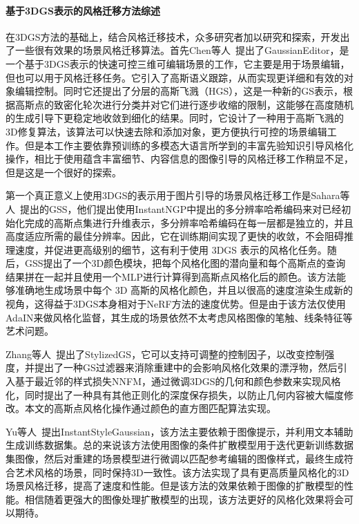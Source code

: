 \paragraph{基于3DGS表示的风格迁移方法综述}
在3DGS方法的基础上，结合风格迁移技术，众多研究者加以研究和探索，开发出了一些很有效果的场景风格迁移算法。首先Chen等人~\cite{chen2024gaussianeditor}提出了GaussianEditor，是一个基于3DGS表示的快速可控三维可编辑场景的工作，它主要是用于场景编辑，但也可以用于风格迁移任务。它引入了高斯语义跟踪，从而实现更详细和有效的对象编辑控制。同时它还提出了分层的高斯飞溅（HGS），这是一种新的GS表示，根据高斯点的致密化轮次进行分类并对它们进行逐步收缩的限制，这能够在高度随机的生成引导下更稳定地收敛到细化的结果。同时，它设计了一种用于高斯飞溅的3D修复算法，该算法可以快速去除和添加对象，更方便执行可控的场景编辑工作。但是本工作主要依靠预训练的多模态大语言所学到的丰富先验知识引导风格化操作，相比于使用蕴含丰富细节、内容信息的图像引导的风格迁移工作稍显不足，但是这是一个很好的探索。

\par 第一个真正意义上使用3DGS的表示用于图片引导的场景风格迁移工作是Sahara等人~\cite{saroha2024gaussian}提出的GSS，他们提出使用InstantNGP中提出的多分辨率哈希编码来对已经初始化完成的高斯点集进行升维表示，多分辨率哈希编码在每一层都是独立的，并且高度适应所需的最佳分辨率。因此，它在训练期间实现了更快的收敛，不会阻碍推理速度，并促进更高级别的细节，这有利于使用 3DGS 表示的风格化任务。随后，GSS提出了一个3D颜色模块，把每个风格化图的潜向量和每个高斯点的查询结果拼在一起并且使用一个MLP进行计算得到高斯点风格化后的颜色。该方法能够准确地生成场景中每个 3D 高斯的风格化颜色，并且以很高的速度渲染生成新的视角，这得益于3DGS本身相对于NeRF方法的速度优势。但是由于该方法仅使用AdaIN来做风格化监督，其生成的场景依然不太考虑风格图像的笔触、线条特征等艺术问题。

\par Zhang等人~\cite{zhang2024stylizedgs}提出了StylizedGS，它可以支持可调整的控制因子，以改变控制强度，并提出了一种GS过滤器来消除重建中的会影响风格化效果的漂浮物，然后引入基于最近邻的样式损失NNFM，通过微调3DGS的几何和颜色参数来实现风格化，同时提出了一种具有其他正则化的深度保存损失，以防止几何内容被大幅度修改。本文的高斯点风格化操作通过颜色的直方图匹配算法实现。

\par Yu等人~\cite{yu2024instantstylegaussian}提出InstantStyleGaussian，该方法主要依赖于图像提示，并利用文本辅助生成训练数据集。总的来说该方法使用图像的条件扩散模型用于迭代更新训练数据集图像，然后对重建的场景模型进行微调以匹配参考编辑的图像样式，最终生成符合艺术风格的场景，同时保持3D一致性。该方法实现了具有更高质量风格化的3D 场景风格迁移，提高了速度和性能。但是该方法的效果依赖于图像的扩散模型的性能。相信随着更强大的图像处理扩散模型的出现，该方法更好的风格化效果将会可以期待。

